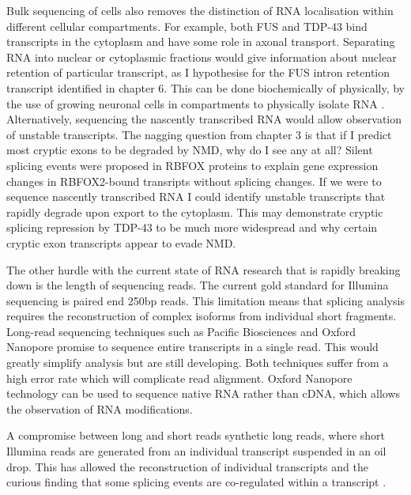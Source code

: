 Bulk sequencing of cells also removes the distinction of RNA localisation within different cellular compartments. %
For example, both FUS and TDP-43 bind transcripts in the cytoplasm and have some role in axonal transport. %
Separating RNA into nuclear or cytoplasmic fractions would give information about nuclear retention of particular transcript, as I hypothesise for the FUS intron retention transcript identified in chapter 6.
This can be done biochemically of physically, by the use of growing neuronal cells in compartments to physically isolate RNA \citep{Taliaferro2016}.
Alternatively, sequencing the nascently transcribed RNA would allow observation of unstable transcripts.
The nagging question from chapter 3 is that if I predict most cryptic exons to be degraded by NMD, why do I see any at all?
Silent splicing events were proposed in RBFOX proteins \citep{Jangi2014} to explain gene expression changes in RBFOX2-bound transripts without splicing changes.
If we were to sequence nascently transcribed RNA I could identify unstable transcripts that rapidly degrade upon export to the cytoplasm.
This may demonstrate cryptic splicing repression by TDP-43 to be much more widespread and why certain cryptic exon transcripts appear to evade NMD.

The other hurdle with the current state of RNA research that is rapidly breaking down is the length of sequencing reads.
The current gold standard for Illumina sequencing is paired end 250bp reads.
This limitation means that splicing analysis requires the reconstruction of complex isoforms from individual short fragments.
Long-read sequencing techniques such as Pacific Biosciences and Oxford Nanopore promise to sequence entire transcripts in a single read.
This would greatly simplify analysis but are still developing. 
Both techniques suffer from a high error rate which will complicate read alignment.
Oxford Nanopore technology can be used to sequence native RNA rather than cDNA, which allows the observation of RNA modifications.

A compromise between long and short reads synthetic long reads, where short Illumina reads are generated from an individual transcript suspended in an oil drop. 
This has allowed the reconstruction of individual transcripts and the curious finding that some splicing events are co-regulated within a transcript \citep{Tilgner2015}.


